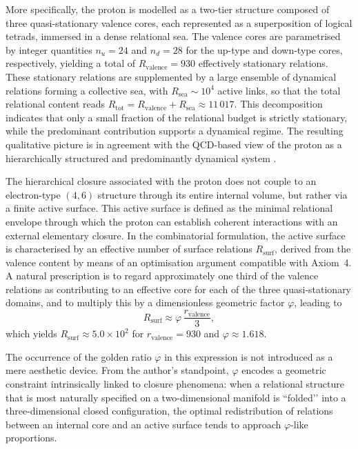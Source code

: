\documentclass[11pt,a4paper]{article}
\begin{document}
More specifically, the proton is modelled as a two-tier structure composed of three quasi-stationary valence cores, each represented as a superposition of logical tetrads, immersed in a dense relational sea. The valence cores are parametrised by integer quantities $n_u = 24$ and $n_d = 28$ for the up-type and down-type cores, respectively, yielding a total of $R_{\text{valence}} = 930$ effectively stationary relations. These stationary relations are supplemented by a large ensemble of dynamical relations forming a collective sea, with $R_{\text{sea}} \sim 10^4$ active links, so that the total relational content reads $R_{\text{tot}} = R_{\text{valence}} + R_{\text{sea}} \approx 11\,017$. This decomposition indicates that only a small fraction of the relational budget is strictly stationary, while the predominant contribution supports a dynamical regime. The resulting qualitative picture is in agreement with the QCD-based view of the proton as a hierarchically structured and predominantly dynamical system \cite{Laubscher_PDL_long}.  

The hierarchical closure associated with the proton does not couple to an electron-type $(4,6)$ structure through its entire internal volume, but rather via a finite active surface. This active surface is defined as the minimal relational envelope through which the proton can establish coherent interactions with an external elementary closure. In the combinatorial formulation, the active surface is characterised by an effective number of surface relations $R_{\text{surf}}$, derived from the valence content by means of an optimisation argument compatible with Axiom~4. A natural prescription is to regard approximately one third of the valence relations as contributing to an effective core for each of the three quasi-stationary domains, and to multiply this by a dimensionless geometric factor $\varphi$, leading to
\[
R_{\text{surf}} \approx \varphi \,\frac{r_{\text{valence}}}{3},
\]
which yields $R_{\text{surf}} \approx 5.0 \times 10^2$ for $r_{\text{valence}} = 930$ and $\varphi \approx 1.618$.  

The occurrence of the golden ratio $\varphi$ in this expression is not introduced as a mere aesthetic device. From the author’s standpoint, $\varphi$ encodes a geometric constraint intrinsically linked to closure phenomena: when a relational structure that is most naturally specified on a two-dimensional manifold is “folded’’ into a three-dimensional closed configuration, the optimal redistribution of relations between an internal core and an active surface tends to approach $\varphi$-like proportions. 
\end{document}
